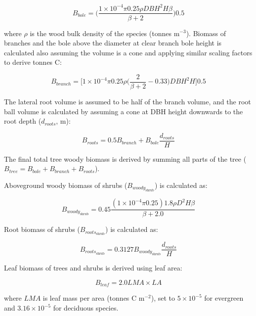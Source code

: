 \documentclass[a4paper, 12pt] {report}
\begin{document}
\begin{equation}  \label{bbole}
B_{bole} = \Big(\frac{1\times10^{-4}\pi 0.25\rho DBH^2H\beta}{\beta + 2}\Big)0.5
\end{equation}

where $\rho$ is the wood bulk density of the species (tonnes m$^{-3}$). Biomass of branches and the bole above the diameter at clear branch bole height is calculated also assuming the volume is a cone and applying similar scaling factors to derive tonnes C:

\begin{equation}  \label{btwigs}
B_{branch} = \Big[1\times10^{-4}\pi0.25 \rho \Big(\frac{2}{\beta + 2} -0.33\Big)DBH^2H\Big]0.5
\end{equation}

The lateral root volume is assumed to be half of the branch volume, and the root ball volume is calculated by assuming a cone at DBH height downwards to the root depth ($d_{roots}$, m):

\begin{equation}  \label{broots}
B_{roots} = 0.5B_{branch} + B_{bole}\frac{d_{roots}}{H}
\end{equation}

The final total tree woody biomass is derived by summing all parts of the tree ($B_{tree} = B_{bole} + B_{branch} + B_{roots}$). 

Aboveground woody biomass of shrubs ($B_{woody_\text{shrub}}$) is calculated as:

\begin{equation} \label{eq:woodybiom}
	B_{woody_\text{shrub}} = 0.45\frac{(1\times10^{-4}\pi0.25)1.8\rho D^2H\beta}{\beta + 2.0}
\end{equation}

Root biomass of shrubs ($B_{roots_\text{shrub}}$) is calculated as:

\begin{equation} \label{eq:rootbiom_shrub}
	B_{roots_\text{shrub}} = 0.3127B_{woody_\text{shrub}}\frac{d_{roots}}{H}
\end{equation}

Leaf biomass of trees and shrubs is derived using leaf area:

\begin{equation} \label{bleaf}
B_{leaf} = 2.0LMA \times LA
\end{equation}

where $LMA$ is leaf mass per area  (tonnes C m$^{-2}$), set to $5 \times 10^{-5}$ for evergreen and $3.16 \times 10^{-5}$  for deciduous species.
\end{document}
